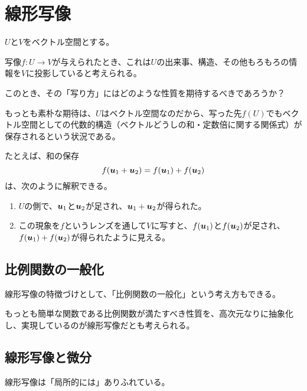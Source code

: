 \documentclass[../../../topic_linear-algebra]{subfiles}
\begin{document}
\sectionline
\section{線形写像}

$U$と$V$をベクトル空間とする。

写像$f \colon U \to V$が与えられたとき、これは$U$の出来事、構造、その他もろもろの情報を$V$に投影していると考えられる。

\br

このとき、その「写り方」にはどのような性質を期待するべきであろうか？

もっとも素朴な期待は、$U$はベクトル空間なのだから、写った先$f(U)$でもベクトル空間としての代数的構造（ベクトルどうしの和・定数倍に関する関係式）が保存されるという状況である。

\begin{mindflow}
\end{mindflow}

たとえば、和の保存
\begin{equation*}
  f(\vb*{u}_1 + \vb*{u}_2) = f(\vb*{u}_1) + f(\vb*{u}_2)
\end{equation*}
は、次のように解釈できる。

\begin{enumerate}
  \item $U$の側で、$\vb*{u}_1$と$\vb*{u}_2$が足され、$\vb*{u}_1 + \vb*{u}_2$が得られた。
  \item この現象を$f$というレンズを通して$V$に写すと、$f(\vb*{u}_1)$と$f(\vb*{u}_2)$が足され、$f(\vb*{u}_1) + f(\vb*{u}_2)$が得られたように見える。
\end{enumerate}

\subsection{比例関数の一般化}

線形写像の特徴づけとして、「比例関数の一般化」という考え方もできる。

もっとも簡単な関数である比例関数が満たすべき性質を、高次元なりに抽象化し、実現しているのが線形写像だとも考えられる。

\subsection{線形写像と微分}

線形写像は「局所的には」ありふれている。
\end{document}
